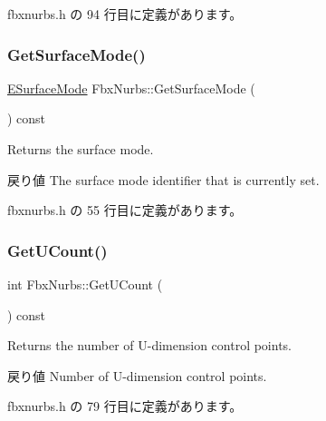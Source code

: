  fbxnurbs.\+h の 94 行目に定義があります。

\mbox{\label{class_fbx_nurbs_a9b482acc4ada0ebd438e8fde99c54b7e}} 
\subsubsection{\texorpdfstring{Get\+Surface\+Mode()}{GetSurfaceMode()}}
{\footnotesize\ttfamily \hyperlink{class_fbx_geometry_adb9d2e34481a2cb40f1d783c665794db}{E\+Surface\+Mode} Fbx\+Nurbs\+::\+Get\+Surface\+Mode (\begin{DoxyParamCaption}{ }\end{DoxyParamCaption}) const\hspace{0.3cm}{\ttfamily [inline]}}

Returns the surface mode. \begin{DoxyReturn}{戻り値}
The surface mode identifier that is currently set. 
\end{DoxyReturn}


 fbxnurbs.\+h の 55 行目に定義があります。

\mbox{\label{class_fbx_nurbs_aa1b6891345f56dd4e30780853ec4721a}} 
\subsubsection{\texorpdfstring{Get\+U\+Count()}{GetUCount()}}
{\footnotesize\ttfamily int Fbx\+Nurbs\+::\+Get\+U\+Count (\begin{DoxyParamCaption}{ }\end{DoxyParamCaption}) const\hspace{0.3cm}{\ttfamily [inline]}}

Returns the number of U-\/dimension control points. \begin{DoxyReturn}{戻り値}
Number of U-\/dimension control points. 
\end{DoxyReturn}


 fbxnurbs.\+h の 79 行目に定義があります。

\mbox{\label{class_fbx_nurbs_aea79ac3dfc5c0d5071cb7cc1d97f5a70}} 

